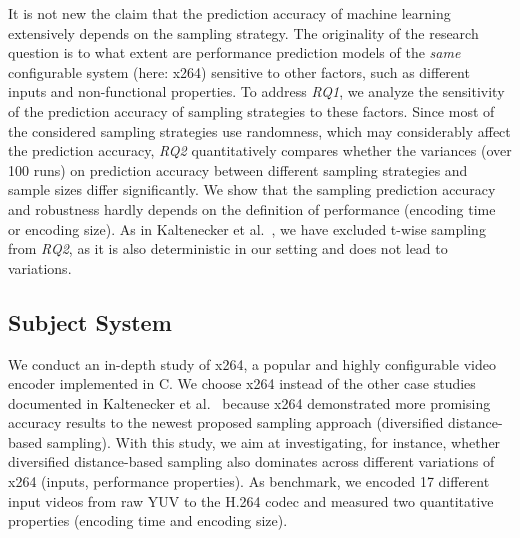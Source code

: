 It is not new the claim that the prediction accuracy of machine learning extensively depends on the sampling strategy.
The originality of the research question is to what extent are performance prediction models of the \emph{same} configurable system (here: x264) sensitive to other factors, such as different inputs and non-functional properties.
To address \textit{RQ1}, we analyze the sensitivity of the prediction accuracy of sampling strategies to these factors.
Since most of the considered sampling strategies use randomness, which may considerably affect the prediction accuracy, 
\textit{RQ2} quantitatively compares whether the variances (over 100 runs) on prediction accuracy between different sampling strategies and sample sizes differ significantly. 
We show that the sampling prediction accuracy and robustness hardly depends on the definition of performance (\ie encoding time or encoding size).
As in Kaltenecker et al.~\cite{kaltenecker2019}, we have excluded t-wise sampling from \textit{RQ2}, as it is also deterministic in our setting and does not lead to variations.

\subsection{Subject System} \label{system}

We conduct an in-depth study of x264, a popular and highly configurable video encoder implemented in C.
We choose x264 instead of the other case studies documented in Kaltenecker et al.~\cite{kaltenecker2019} because x264 demonstrated more promising accuracy results to the newest proposed sampling approach (\ie diversified distance-based sampling).
With this study, we aim at investigating, for instance, whether diversified distance-based sampling also dominates across different variations of x264 (\ie inputs, performance properties). 
As benchmark, we encoded 17 different input videos from raw YUV to the H.264 codec %
and measured two quantitative properties (encoding time and encoding size). %

